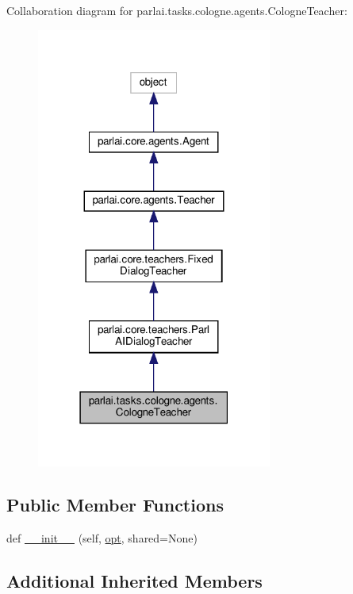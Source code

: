 Collaboration diagram for parlai.\+tasks.\+cologne.\+agents.\+Cologne\+Teacher\+:
\nopagebreak
\begin{figure}[H]
\begin{center}
\leavevmode
\includegraphics[width=219pt]{dd/da3/classparlai_1_1tasks_1_1cologne_1_1agents_1_1CologneTeacher__coll__graph}
\end{center}
\end{figure}
\subsection*{Public Member Functions}
\begin{DoxyCompactItemize}
\item 
def \hyperlink{classparlai_1_1tasks_1_1cologne_1_1agents_1_1CologneTeacher_a6a17255f64a8e05282b1f0ec0af95758}{\+\_\+\+\_\+init\+\_\+\+\_\+} (self, \hyperlink{classparlai_1_1core_1_1agents_1_1Teacher_a3ce6243860ce978a897922863ed32fa4}{opt}, shared=None)
\end{DoxyCompactItemize}
\subsection*{Additional Inherited Members}


